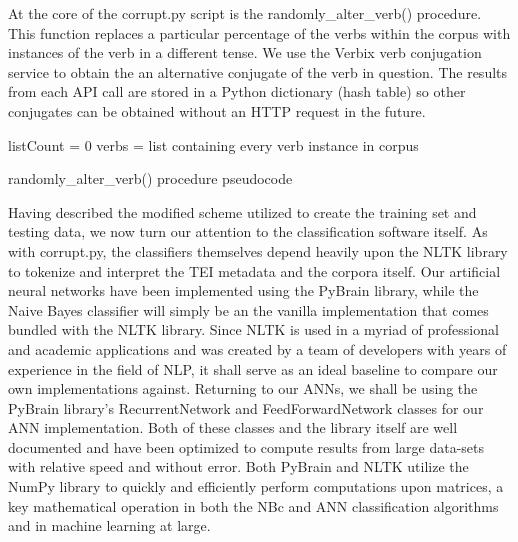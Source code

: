 \documentclass{article}
\begin{document}
At the core of the corrupt.py script is the randomly\_alter\_verb() procedure. This function  replaces a particular percentage of the verbs within the corpus with instances of the verb in a different tense. We use the Verbix verb conjugation service \citep{verbix} to obtain the an alternative conjugate of the verb in question. The results from each API call are stored in a Python dictionary (hash table) so other conjugates can be obtained without an HTTP request in the future. 
\begin{center}
\begin{algorithm}[H]
 listCount = 0\;
 verbs = list containing every verb instance in corpus\;
 \caption{randomly\_alter\_verb() procedure pseudocode}
\end{algorithm}
\end{center}

Having described the modified scheme utilized to create the training set and testing data, we now turn our attention to the classification software itself. As with corrupt.py, the classifiers themselves depend heavily upon the NLTK library to tokenize and interpret the TEI metadata and the corpora itself. Our artificial neural networks have been implemented using the PyBrain library, while the Naive Bayes classifier will simply be an the vanilla implementation that comes bundled with the NLTK library. Since NLTK is used in a myriad of professional and academic applications and was created by a team of developers with years of experience in the field of NLP, it shall serve as an ideal baseline to compare our own implementations against. Returning to our ANNs, we shall be using the PyBrain library's RecurrentNetwork and FeedForwardNetwork classes for our ANN implementation. Both of these classes and the library itself are well documented and have been optimized to compute results from large data-sets with relative speed and without error. Both PyBrain and NLTK utilize the NumPy library to quickly and efficiently perform computations upon matrices, a key mathematical operation in both the  NBc and ANN classification algorithms and in machine learning at large. 
\end{document}

